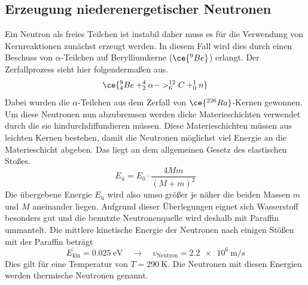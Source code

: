 \subsection{Erzeugung niederenergetischer Neutronen}
Ein Neutron als freies Teilchen ist instabil daher muss es für die Verwendung von Kernreaktionen zunächst erzeugt werden.
In diesem Fall wird dies durch einen Beschuss von $\alpha$-Teilchen auf Berylliumkerne ($\ce{^{9}Be}$) erlangt.
Der Zerfallprozess sieht hier folgendermaßen aus.
\begin{equation}
\ce{^{9}_{4}Be + ^{4}_{2}{\alpha} -> ^{12}_{6}C + ^{1}_{0}n}
\end{equation}
Dabei wurden die $\alpha$-Teilchen aus dem Zerfall von $\ce{^{226}Ra}$-Kernen gewonnen. Um diese Neutronen nun abzubremsen werden dicke Materieschichten verwendet durch die sie hindurchdiffundieren müssen.
Diese Materieschichten müssen aus leichten Kernen bestehen, damit die Neutronen möglichst viel Energie an die Materieschicht abgeben. Das liegt an dem allgemeinen Gesetz
des elastischen Stoßes.
\begin{equation}
E_{ü} = E_{0} \cdot \frac{4Mm}{(M+m)^{2}}
\end{equation}
Die übergebene Energie $E_{ü}$ wird also umso größer je näher die beiden Massen $m$ und $M$ aneinander liegen.
Aufgrund dieser Überlegungen eignet sich Wasserstoff besonders gut und die benutzte Neutronenquelle wird deshalb mit Paraffin ummantelt.
Die mittlere kinetische Energie der Neutronen nach einigen Stößen mit der Paraffin beträgt
\begin{equation*}
\overline{E_{\text{kin}}} = \SI{0.025}{\electronvolt} \quad \to \quad \overline{v_{\text{Neutron}}} = \SI{2.2e6}{\meter\per\second}
\end{equation*}
Dies gilt für eine Temperatur von $T = \SI{290}{\kelvin}$. Die Neutronen mit diesen Energien werden thermische Neutronen genannt.

